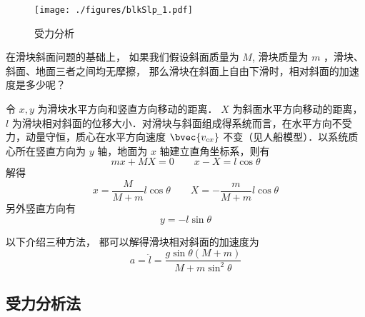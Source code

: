 
\begin{issues}
\issueTODO
\end{issues}


\begin{figure}[ht]
\centering
\texttt{[image: ./figures/blkSlp\_1.pdf]}
\caption{受力分析} \label{blkSlp_fig1}
\end{figure}

在滑块斜面问题的基础上， 如果我们假设斜面质量为 $M$, 滑块质量为 $m$ ，滑块、斜面、地面三者之间均无摩擦， 那么滑块在斜面上自由下滑时，相对斜面的加速度是多少呢？

令 $x, y$ 为滑块水平方向和竖直方向移动的距离． $X$ 为斜面水平方向移动的距离， $l$ 为滑块相对斜面的位移大小．对滑块与斜面组成得系统而言，在水平方向不受力，动量守恒，质心在水平方向速度 $\bvec{v_{cx}}$ 不变（见人船模型）．以系统质心所在竖直方向为 $y$ 轴，地面为 $x$ 轴建立直角坐标系，则有
\begin{equation}
mx+MX=0 \qquad x-X=l\cos\theta
\end{equation}
解得
\begin{equation}\label{blkSlp_eq2}
x = \frac{M}{M + m}l\cos\theta \qquad X = -\frac{m}{M + m}l\cos\theta
\end{equation}
另外竖直方向有
\begin{equation}
y = -l\sin\theta
\end{equation}

以下介绍三种方法， 都可以解得滑块相对斜面的加速度为
\begin{equation}\label{blkSlp_eq1}
a = \ddot l = \frac{g\sin\theta(M+m)}{M + m\sin^2\theta}
\end{equation}

\subsection{受力分析法}

